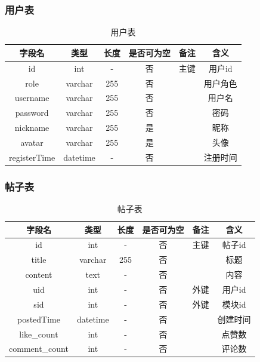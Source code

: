 \documentclass[UTF8]{ctexart}
\begin{document}
\subsubsection{用户表}

\begin{table}[H]
  \centering
  \begin{tabular}{|c|c|c|c|c|c|}
  \hline
      字段名 & 类型 & 长度 & 是否可为空&备注&含义\\ \hline
      id & int & - & 否 & 主键 & 用户id \\ \hline
      role & varchar &255  & 否 &  & 用户角色 \\ \hline
      username & varchar &255  & 否 &  & 用户名 \\ \hline
      password & varchar & 255 & 否 &  & 密码 \\ \hline
      nickname & varchar & 255 & 是 &  & 昵称 \\ \hline
      avatar & varchar & 255 & 是 &  & 头像 \\ \hline
      registerTime & datetime &-  & 否 &  & 注册时间 \\ \hline
  \end{tabular}
  \caption{用户表}
\end{table}

\subsubsection{帖子表}

\begin{table}[H]
  \centering
  \begin{tabular}{|c|c|c|c|c|c|}
  \hline
      字段名 & 类型 & 长度 & 是否可为空&备注&含义\\ \hline
      id & int & - & 否 & 主键 & 帖子id \\ \hline
      title & varchar &255  & 否 &  & 标题 \\ \hline
      content & text & - & 否 &  & 内容 \\ \hline
      uid & int & - & 否 & 外键 & 用户id \\ \hline
      sid & int & - & 否 & 外键 & 模块id \\ \hline
      postedTime & datetime & - & 否 &  & 创建时间 \\ \hline
      like\_count & int & - & 否 &  & 点赞数 \\ \hline
      comment\_count & int & - & 否 &  & 评论数 \\ \hline
  \end{tabular}
  \caption{帖子表}
\end{table}
\end{document}
